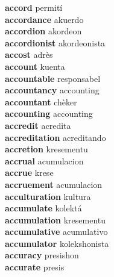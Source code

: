 \textbf{accord } permití \\
\textbf{accordance } akuerdo \\
\textbf{accordion } akordeon \\
\textbf{accordionist } akordeonista \\
\textbf{accost } adrès \\
\textbf{account } kuenta \\
\textbf{accountable } responsabel \\
\textbf{accountancy } accounting \\
\textbf{accountant } chèker \\
\textbf{accounting } accounting \\
\textbf{accredit } acredita \\
\textbf{accreditation } acreditando \\
\textbf{accretion } kresementu \\
\textbf{accrual } acumulacion \\
\textbf{accrue } krese \\
\textbf{accruement } acumulacion \\
\textbf{acculturation } kultura \\
\textbf{accumulate } kolektá \\
\textbf{accumulation } kresementu \\
\textbf{accumulative } acumulativo \\
\textbf{accumulator } kolekshonista \\
\textbf{accuracy } presishon \\
\textbf{accurate } presis \\
